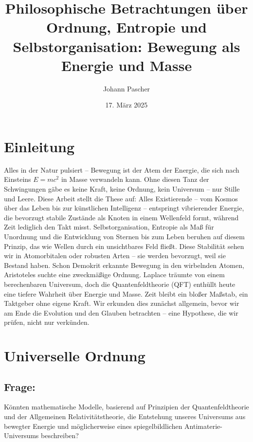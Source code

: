 \documentclass{article}
\title{Philosophische Betrachtungen über Ordnung, Entropie und Selbstorganisation: Bewegung als Energie und Masse}
\author{Johann Pascher}
\date{17. März 2025}
\begin{document}
	
	\maketitle
	
	\section{Einleitung}
	Alles in der Natur pulsiert – Bewegung ist der Atem der Energie, die sich nach Einsteins $E = mc^2$ in Masse verwandeln kann. Ohne diesen Tanz der Schwingungen gäbe es keine Kraft, keine Ordnung, kein Universum – nur Stille und Leere. Diese Arbeit stellt die These auf: Alles Existierende – vom Kosmos über das Leben bis zur künstlichen Intelligenz – entspringt vibrierender Energie, die bevorzugt stabile Zustände als Knoten in einem Wellenfeld formt, während Zeit lediglich den Takt misst. Selbstorganisation, Entropie als Maß für Unordnung und die Entwicklung von Sternen bis zum Leben beruhen auf diesem Prinzip, das wie Wellen durch ein unsichtbares Feld fließt. Diese Stabilität sehen wir in Atomorbitalen oder robusten Arten – sie werden bevorzugt, weil sie Bestand haben. Schon Demokrit erkannte Bewegung in den wirbelnden Atomen, Aristoteles suchte eine zweckmäßige Ordnung. Laplace träumte von einem berechenbaren Universum, doch die Quantenfeldtheorie (QFT) enthüllt heute eine tiefere Wahrheit über Energie und Masse. Zeit bleibt ein bloßer Maßstab, ein Taktgeber ohne eigene Kraft. Wir erkunden dies zunächst allgemein, bevor wir am Ende die Evolution und den Glauben betrachten – eine Hypothese, die wir prüfen, nicht nur verkünden.
	
	\section{Universelle Ordnung}
	
	\subsection*{Frage:}
	Könnten mathematische Modelle, basierend auf Prinzipien der Quantenfeldtheorie und der Allgemeinen Relativitätstheorie, die Entstehung unseres Universums aus bewegter Energie und möglicherweise eines spiegelbildlichen Antimaterie-Universums beschreiben?
	
\end{document}
